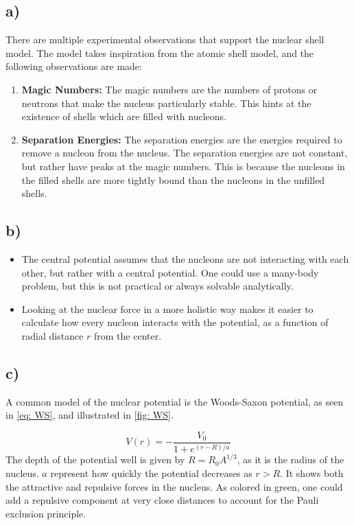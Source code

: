 \documentclass{article}
\begin{document}
\subsection*{a)}
There are multiple experimental observations that support the nuclear shell model. The model takes inspiration from the atomic shell model, and the following observations are made:
\begin{enumerate}
    \item \textbf{Magic Numbers:} The magic numbers are the numbers of protons or neutrons that make the nucleus particularly stable. This hints at the existence of shells which are filled with nucleons.
    \item \textbf{Separation Energies:} The separation energies are the energies required to remove a nucleon from the nucleus. The separation energies are not constant, but rather have peaks at the magic numbers. This is because the nucleons in the filled shells are more tightly bound than the nucleons in the unfilled shells.
\end{enumerate}

\subsection*{b)}
\begin{itemize}
    \item The central potential assumes that the nucleons are not interacting with each other, but rather with a central potential. One could use a many-body problem, but this is not practical or always solvable analytically. 
    \item Looking at the nuclear force in a more holistic way makes it easier to calculate how every nucleon interacts with the potential, as a function of radial distance $r$ from the center. 
\end{itemize}

\subsection*{c)}
A common model of the nuclear potential is the Woods-Saxon potential, as seen in \cref{eq: WS}, and illustrated in \cref{fig: WS}. 

\begin{equation}\label{eq: WS}
V(r) = - \frac{V_0}{1 + e^{(r - R)/a}}
\end{equation}
The depth of the potential well is given by $R = R_0 A^{1 / 3}$, as it is the radius of the nucleus. $a$ represent how quickly the potential decreases as $r > R$. It shows both the attractive and repulsive forces in the nucleus. As colored in green, one could add a repulsive component at very close distances to account for the Pauli exclusion principle.
\end{document}
